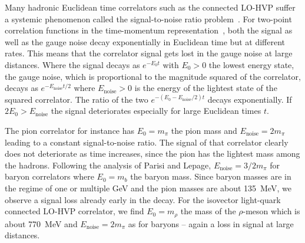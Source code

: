 Many hadronic Euclidean time correlators such as the connected LO-HVP suffer a systemic phenomenon called the signal-to-noise ratio problem~\cite{parisi1984,lepage1989}.
For two-point correlation functions in the time-momentum representation~\cite{Bernecker:2011}, both the signal as well as the gauge noise decay exponentially in Euclidean time but at different rates.
This means that the correlator signal gets lost in the gauge noise at large distances.
Where the signal decays as $e^{-E_0 t}$ with $E_0 > 0$ the lowest energy state, the gauge noise, which is proportional to the magnitude squared of the correlator, decays as $e^{-E_{\text{noise}}t/2}$ where $E_{\text{noise}} > 0$ is the energy of the lightest state of the squared correlator.
The ratio of the two $e^{-(E_0 - E_{\text{noise}}/2)t}$ decays exponentially.
If $2E_0 > E_{\text{noise}}$ the signal deteriorates especially for large Euclidean times $t$.

The pion correlator for instance has $E_0 = m_{\pi}$ the pion mass and $E_{\text{noise}} = 2 m_{\pi}$ leading to a constant signal-to-noise ratio.
The signal of that correlator clearly does not deteriorate as time increases, since the pion has the lightest mass among the hadrons.
Following the analysis of Parisi and Lepage, $E_{\text{noise}} = 3/2 m_{\pi}$ for baryon correlators where $E_0 = m_{b}$ the baryon mass.
Since baryon masses are in the regime of one or multiple GeV and the pion masses are about \SI{135}{\mega \eV}, we observe a signal loss already early in the decay.
For the isovector light-quark connected LO-HVP correlator, we find $E_0 = m_{\rho}$ the mass of the $\rho$-meson which is about \SI{770}{\mega \eV} and $E_{\text{noise}} = 2 m_{\pi}$ as for baryons -- again a loss in signal at large distances.

